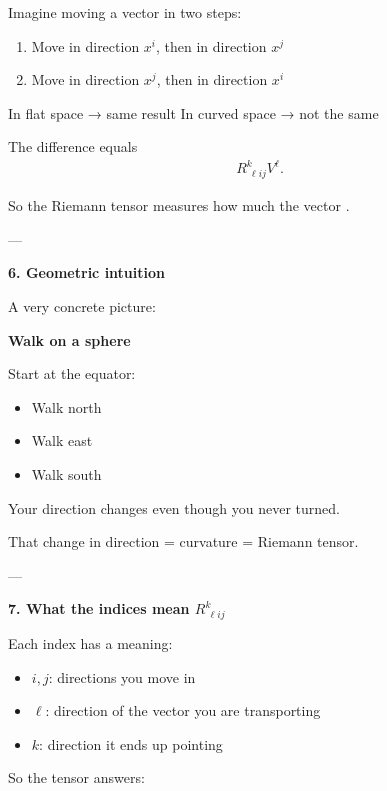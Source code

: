 \documentclass[12pt,a4paper]{report}
\begin{document}
\begin{description}
\begin{description}
Imagine moving a vector in two steps:

\begin{enumerate}
\item Move in direction $x^i$, then in direction $x^j$
\item Move in direction $x^j$, then in direction $x^i$
\end{enumerate}

In flat space → same result
In curved space → not the same

The difference equals
\begin{align*}
R^k_{\ \ell ij}V^\ell.
\end{align*}

So the Riemann tensor measures how much the vector .

---

\item \textbf{6. Geometric intuition}

A very concrete picture:

\textbf{Walk on a sphere}

Start at the equator:

\begin{itemize}
\item Walk north
\item Walk east
\item Walk south
\end{itemize}

Your direction changes even though you never turned.

That change in direction = curvature = Riemann tensor.

---

\item \textbf{7. What the indices mean $R^k_{\ \ell ij}$}

Each index has a meaning:

\begin{itemize}
\item $i, j$: directions you move in
\item $\ell$: direction of the vector you are transporting
\item $k$: direction it ends up pointing
\end{itemize}

So the tensor answers:



\end{description}
\end{description}
\end{document}
